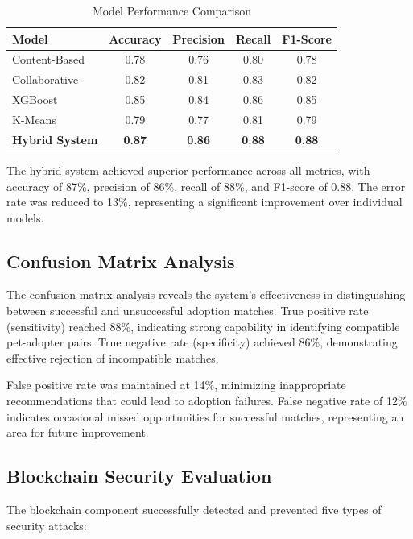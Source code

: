 \documentclass[conference]{IEEEtran}
\begin{document}
\begin{table}[htbp]
\caption{Model Performance Comparison}
\begin{center}
\begin{tabular}{|l|c|c|c|c|}
\hline
\textbf{Model} & \textbf{Accuracy} & \textbf{Precision} & \textbf{Recall} & \textbf{F1-Score} \\
\hline
Content-Based & 0.78 & 0.76 & 0.80 & 0.78 \\
Collaborative & 0.82 & 0.81 & 0.83 & 0.82 \\
XGBoost & 0.85 & 0.84 & 0.86 & 0.85 \\
K-Means & 0.79 & 0.77 & 0.81 & 0.79 \\
\hline
\textbf{Hybrid System} & \textbf{0.87} & \textbf{0.86} & \textbf{0.88} & \textbf{0.88} \\
\hline
\end{tabular}
\end{center}
\end{table}

The hybrid system achieved superior performance across all metrics, with accuracy of 87\%, precision of 86\%, recall of 88\%, and F1-score of 0.88. The error rate was reduced to 13\%, representing a significant improvement over individual models.

\subsection{Confusion Matrix Analysis}

The confusion matrix analysis reveals the system's effectiveness in distinguishing between successful and unsuccessful adoption matches. True positive rate (sensitivity) reached 88\%, indicating strong capability in identifying compatible pet-adopter pairs. True negative rate (specificity) achieved 86\%, demonstrating effective rejection of incompatible matches.

False positive rate was maintained at 14\%, minimizing inappropriate recommendations that could lead to adoption failures. False negative rate of 12\% indicates occasional missed opportunities for successful matches, representing an area for future improvement.

\subsection{Blockchain Security Evaluation}

The blockchain component successfully detected and prevented five types of security attacks:
\end{document}

